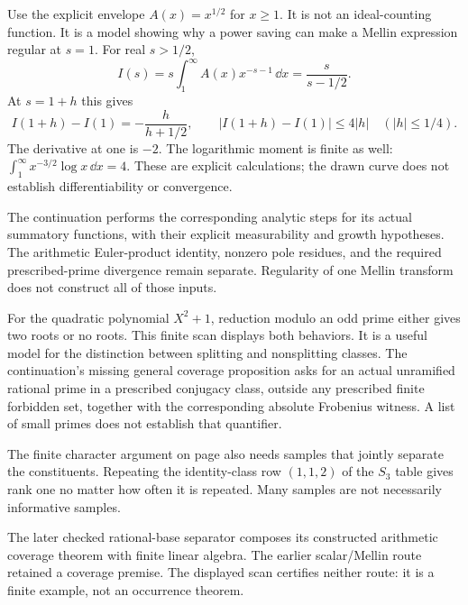 Use the explicit envelope $A(x)=x^{1/2}$ for $x\ge1$. It is not an ideal-counting function. It is a model showing why a power saving can make a Mellin expression regular at $s=1$.
For real $s>1/2$,
\[
I(s)=s\int_1^\infty A(x)x^{-s-1}\,\dd x
=\frac{s}{s-1/2}.
\]
At $s=1+h$ this gives
\[
I(1+h)-I(1)=-\frac{h}{h+1/2},
\qquad |I(1+h)-I(1)|\le4|h|
\quad (|h|\le1/4).
\]
The derivative at one is $-2$. The logarithmic moment is finite as well: $\int_1^\infty x^{-3/2}\log x\,\dd x=4$. These are explicit calculations; the drawn curve does not establish differentiability or convergence.

The continuation performs the corresponding analytic steps for its actual summatory functions, with their explicit measurability and growth hypotheses. The arithmetic Euler-product identity, nonzero pole residues, and the required prescribed-prime divergence remain separate. Regularity of one Mellin transform does not construct all of those inputs.

For the quadratic polynomial $X^2+1$, reduction modulo an odd prime either gives two roots or no roots. This finite scan displays both behaviors. It is a useful model for the distinction between splitting and nonsplitting classes.
The continuation's missing general coverage proposition asks for an actual unramified rational prime in a prescribed conjugacy class, outside any prescribed finite forbidden set, together with the corresponding absolute Frobenius witness. A list of small primes does not establish that quantifier.

The finite character argument on page  also needs samples that jointly separate the constituents. Repeating the identity-class row $(1,1,2)$ of the $S_3$ table gives rank one no matter how often it is repeated. Many samples are not necessarily informative samples.

The later checked rational-base separator composes its constructed arithmetic coverage theorem with finite linear algebra. The earlier scalar/Mellin route retained a coverage premise. The displayed scan certifies neither route: it is a finite example, not an occurrence theorem.

